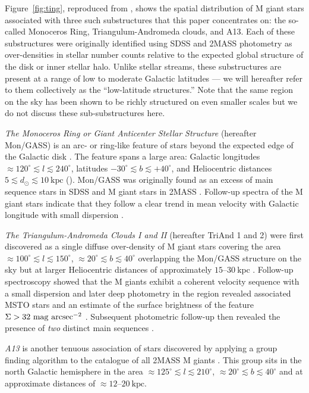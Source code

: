 \documentclass[galaxies,article,submit,moreauthors,pdftex,10pt,a4paper]{mdpi}
\newcommand{\kpc}{\mathrm{kpc}}
\begin{document}
Figure~\ref{fig:ting}, reproduced from \cite{li17}, shows the spatial distribution of M giant stars associated with three such substructures that this paper concentrates on: the so-called Monoceros Ring, Triangulum-Andromeda clouds, and A13.
Each of these substructures were originally identified using SDSS and 2MASS photometry as over-densities in stellar number counts relative to the expected global structure of the disk or inner stellar halo.
Unlike stellar streams, these substructures are present at a range of low to moderate Galactic latitudes --- we will hereafter refer to them collectively as the ``low-latitude structures.''
Note that the same region on the sky has been shown to be richly structured on even smaller scales\citep{slater14,martin14,deason14} but we do not discuss these sub-substructures here.
\begin{description}
\item{\it The Monoceros Ring or Giant Anticenter Stellar Structure} (hereafter Mon/GASS) is an arc- or ring-like feature of stars beyond the expected edge of the Galactic disk \citep[assumed to be $\approx 5~\kpc$ beyond the Sun in cylindrical radius][]{robin92}.
The feature spans a large area: Galactic longitudes $\approx 120^\circ \lesssim l \lesssim 240^\circ$, latitudes $-30^\circ \lesssim b \lesssim +40^\circ$, and Heliocentric distances $5\lesssim d_\odot \lesssim 10~\kpc$ (\citealt{Morganson:2016}).
Mon/GASS was originally found as an excess of main sequence stars in SDSS \citep{yanny03,ibata03} and M giant stars in 2MASS \citep{rochapinto03}.
Follow-up spectra of the M giant stars indicate that they follow a clear trend in mean velocity with Galactic longitude with small dispersion \citep{crane04}.
\item{\it The Triangulum-Andromeda Clouds I and II} (hereafter TriAnd 1 and 2) were first discovered as a single diffuse over-density of M giant stars covering the area $\approx 100^\circ \lesssim l \lesssim 150^\circ$, $\approx 20^\circ \lesssim b \lesssim 40^\circ$ overlapping the Mon/GASS structure on the sky but at larger Heliocentric distances of approximately $15$--$30~\kpc$ \citep{rochapinto04}.
Follow-up spectroscopy showed that the M giants exhibit a coherent velocity sequence with a small dispersion \citep{rochapinto04} and later deep photometry in the region revealed associated MSTO stars and an estimate of the surface brightness of the feature $\Sigma > 32~{\rm mag}~{\rm arcsec}^{-2}$ \cite{majewski04}.
Subsequent photometric follow-up then revealed the presence of {\it two} distinct main sequences \citep{martin07}.
\item{\it A13} is another tenuous association of stars discovered by applying a group finding algorithm \citep{sharma09} to the catalogue of all 2MASS M giants \citep{sharma10}.
This group sits in the north Galactic hemisphere in the area $\approx 125^\circ \lesssim l \lesssim 210^\circ$, $\approx 20^\circ \lesssim b \lesssim 40^\circ$ and at approximate distances of $\approx 12$--$20~\kpc$.
\end{description}
\end{document}
